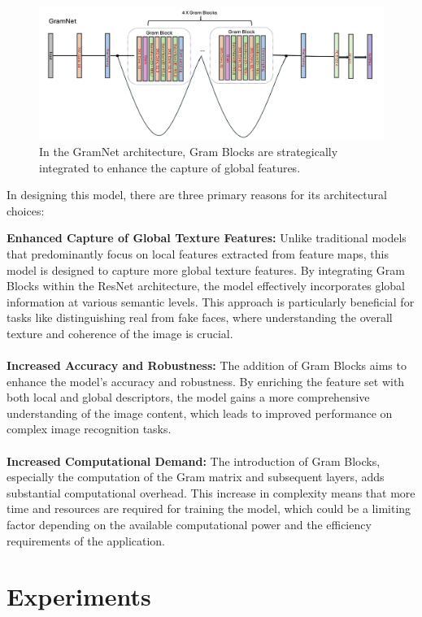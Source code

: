 \documentclass[final]{cvpr}
\begin{document}
\begin{figure}[t]
\begin{center}
   \includegraphics[width=0.8\linewidth]{images/GramNet.jpg}
\end{center}
   \caption{In the GramNet architecture, Gram Blocks are strategically integrated to enhance the capture of global features.}
\label{fig:long}
\label{fig:gramnet}
\end{figure}

In designing this model, there are three primary reasons for its architectural choices:  

\textbf{Enhanced Capture of Global Texture Features:} Unlike traditional models that predominantly focus on local features extracted from feature maps, this model is designed to capture more global texture features. By integrating Gram Blocks within the ResNet architecture, the model effectively incorporates global information at various semantic levels. This approach is particularly beneficial for tasks like distinguishing real from fake faces, where understanding the overall texture and coherence of the image is crucial.
\\
\\
\textbf{Increased Accuracy and Robustness:} The addition of Gram Blocks aims to enhance the model's accuracy and robustness. By enriching the feature set with both local and global descriptors, the model gains a more comprehensive understanding of the image content, which leads to improved performance on complex image recognition tasks.
\\
\\
\textbf{Increased Computational Demand:} The introduction of Gram Blocks, especially the computation of the Gram matrix and subsequent layers, adds substantial computational overhead. This increase in complexity means that more time and resources are required for training the model, which could be a limiting factor depending on the available computational power and the efficiency requirements of the application.

\section{Experiments}
\end{document}
